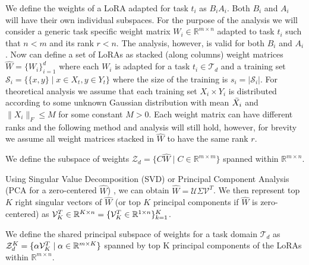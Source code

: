 \begin{definition}
\label{def:loraset}
We define the weights of a LoRA adapted for task $t_i$ as $B_iA_i$. Both $B_i$ and $A_i$ will have their own individual subspaces. For the purpose of the analysis we will consider a generic task specific weight matrix $W_i \in \mathbb{R}^{m\times n}$ adapted to task $t_i$ such that $n<m$ and its rank $r<n$. The analysis, however, is valid for both $B_i$ and $A_i$. 
Now can define a set of LoRAs as stacked (along columns) weight matrices $\hat{W} = \{W_i \}^{d}_{i=1}$ where each $W_i$ is adapted for a task $t_i\in\mathcal{T}_d$ and a training set $\mathcal{S}_i=\{\{x,y\} \mid x\in X_t, y\in Y_t\}$ where the size of the training is $s_i = |\mathcal{S}_i|$. For theoretical analysis we assume that each training set $X_i \times Y_i$ is distributed according to some unknown Gaussian distribution with mean $\Bar{X_i}$ and $\lVert X_i\lVert_F\leq M$ for some constant $M>0$. Each weight matrix can have different ranks and the following method and analysis will still hold, however, for brevity we assume all weight matrices stacked in $\hat{W}$ to have the same rank $r$. 
\end{definition}
\begin{definition}
\label{def:subspace}
We define the subspace of weights $\mathcal{Z}_{d} = \{C\hat{W} \mid C\in\mathbb{R}^{m\times m}\}$ spanned within $\mathbb{R}^{m\times n}$. 
\end{definition}
Using Singular Value Decomposition (SVD) or Principal Component Analysis (PCA for a zero-centered $\hat{W}$) , we can obtain $\hat{W}=\mathcal{U}\Sigma \mathcal{V}^T$. We then represent top $K$ right singular vectors of $\hat{W}$ (or top $K$ principal components if $\hat{W}$ is zero-centered) as $\mathcal{V}^T_{K} \in\mathbb{R}^{K\times n}=\{\mathcal{V}^T_{K}\in\mathbb{R}^{1\times n}\}^K_{k=1}$.
\begin{definition}
\label{def:principalsubspace}
We define the shared principal subspace of weights for a task domain $\mathcal{T}_d$ as $\mathcal{Z}^{K}_d = \{\alpha \mathcal{V}^T_{K} \mid \alpha\in\mathbb{R}^{m\times K}\}$ spanned by top K principal components of the LoRAs within $\mathbb{R}^{m\times n}$. 
\end{definition}

